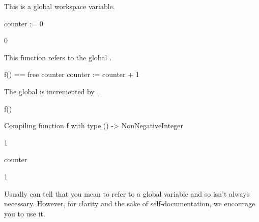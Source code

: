 \begin{xtc}
\begin{xtccomment}
This is a global workspace variable.
\end{xtccomment}
\begin{spadsrc}
counter := 0 
\end{spadsrc}
\begin{TeXOutput}
\begin{fricasmath}{1}
0%
\end{fricasmath}
\end{TeXOutput}
\end{xtc}
\begin{xtc}
\begin{xtccomment}
This function refers to the global .
\end{xtccomment}
\begin{spadsrc}
f() ==
  free counter
  counter := counter + 1
\end{spadsrc}
\end{xtc}
\begin{xtc}
\begin{xtccomment}
The global  is incremented by .
\end{xtccomment}
\begin{spadsrc}
f() 
\end{spadsrc}
\begin{MessageOutput}
   Compiling function f with type () -> NonNegativeInteger 
\end{MessageOutput}
\begin{TeXOutput}
\begin{fricasmath}{3}
1%
\end{fricasmath}
\end{TeXOutput}
\end{xtc}
\begin{xtc}
\begin{xtccomment}
\end{xtccomment}
\begin{spadsrc}
counter 
\end{spadsrc}
\begin{TeXOutput}
\begin{fricasmath}{4}
1%
\end{fricasmath}
\end{TeXOutput}
\end{xtc}

Usually \Language{} can tell that you mean to refer to a global
variable and so  isn't always necessary.
However, for clarity and the sake of self-documentation, we encourage
you to use it.


